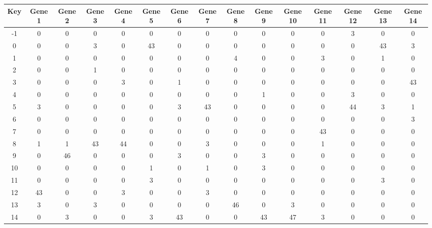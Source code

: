 \begin{tabular}{|c|c|c|c|c|c|c|c|c|c|c|c|c|c|c|}
\hline
Key & Gene 1 & Gene 2 & Gene 3 & Gene 4 & Gene 5 & Gene 6 & Gene 7 & Gene 8 & Gene 9 & Gene 10 & Gene 11 & Gene 12 & Gene 13 & Gene 14 \\
\hline
-1 & 0 & 0 & 0 & 0 & 0 & 0 & 0 & 0 & 0 & 0 & 0 & 3 & 0 & 0 \\
0 & 0 & 0 & 3 & 0 & 43 & 0 & 0 & 0 & 0 & 0 & 0 & 0 & 43 & 3 \\
1 & 0 & 0 & 0 & 0 & 0 & 0 & 0 & 4 & 0 & 0 & 3 & 0 & 1 & 0 \\
2 & 0 & 0 & 1 & 0 & 0 & 0 & 0 & 0 & 0 & 0 & 0 & 0 & 0 & 0 \\
3 & 0 & 0 & 0 & 3 & 0 & 1 & 0 & 0 & 0 & 0 & 0 & 0 & 0 & 43 \\
4 & 0 & 0 & 0 & 0 & 0 & 0 & 0 & 0 & 1 & 0 & 0 & 3 & 0 & 0 \\
5 & 3 & 0 & 0 & 0 & 0 & 3 & 43 & 0 & 0 & 0 & 0 & 44 & 3 & 1 \\
6 & 0 & 0 & 0 & 0 & 0 & 0 & 0 & 0 & 0 & 0 & 0 & 0 & 0 & 3 \\
7 & 0 & 0 & 0 & 0 & 0 & 0 & 0 & 0 & 0 & 0 & 43 & 0 & 0 & 0 \\
8 & 1 & 1 & 43 & 44 & 0 & 0 & 3 & 0 & 0 & 0 & 1 & 0 & 0 & 0 \\
9 & 0 & 46 & 0 & 0 & 0 & 3 & 0 & 0 & 3 & 0 & 0 & 0 & 0 & 0 \\
10 & 0 & 0 & 0 & 0 & 1 & 0 & 1 & 0 & 3 & 0 & 0 & 0 & 0 & 0 \\
11 & 0 & 0 & 0 & 0 & 3 & 0 & 0 & 0 & 0 & 0 & 0 & 0 & 3 & 0 \\
12 & 43 & 0 & 0 & 3 & 0 & 0 & 3 & 0 & 0 & 0 & 0 & 0 & 0 & 0 \\
13 & 3 & 0 & 3 & 0 & 0 & 0 & 0 & 46 & 0 & 3 & 0 & 0 & 0 & 0 \\
14 & 0 & 3 & 0 & 0 & 3 & 43 & 0 & 0 & 43 & 47 & 3 & 0 & 0 & 0 \\
\hline
\end{tabular}